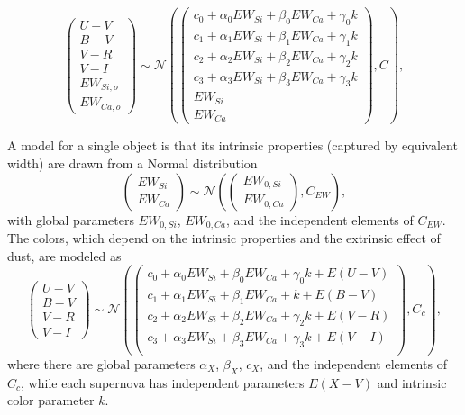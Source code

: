 \documentclass[11pt, oneside]{article}   	%
\begin{document}
\begin{equation}
\left(
\begin{matrix}
U-V\\B-V\\V-R\\V-I\\EW_{Si, o}\\ EW_{Ca, o}
\end{matrix}
\right) \sim \mathcal{N}
\left(
\left(
\begin{matrix}
c_0+\alpha_0 EW_{Si} + \beta_0 EW_{Ca} +\gamma_0 k  \\
c_1+\alpha_1 EW_{Si} + \beta_1 EW_{Ca}  +\gamma_1 k  \\
c_2+\alpha_2 EW_{Si} + \beta_2 EW_{Ca} +\gamma_2 k\\
c_3+\alpha_3 EW_{Si} + \beta_3 EW_{Ca} +\gamma_3 k\\
EW_{Si}\\ EW_{Ca}
\end{matrix}
\right)
,C
\right),
\end{equation}


A model for a single object is that its intrinsic properties (captured by equivalent width) are drawn from a Normal distribution
\begin{equation}
\left(
\begin{matrix}
EW_{Si}\\ EW_{Ca}
\end{matrix}
\right) \sim \mathcal{N}
\left(
\left(
\begin{matrix}
EW_{0, Si}\\ EW_{0, Ca}
\end{matrix}
\right)
,C_{EW}
\right),
\end{equation}
with global parameters $EW_{0, Si}$, $EW_{0, Ca}$, and the independent elements of $C_{EW}$.
The colors, which depend on the intrinsic properties and the extrinsic effect of dust, are modeled as
\begin{equation}
\left(
\begin{matrix}
U-V\\B-V\\V-R\\V-I
\end{matrix}
\right) \sim \mathcal{N}
\left(
\left(
\begin{matrix}
c_0+\alpha_0 EW_{Si} + \beta_0 EW_{Ca} +\gamma_0 k+ E(U-V) \\
c_1+\alpha_1 EW_{Si} + \beta_1 EW_{Ca}  +k +E(B-V) \\
c_2+\alpha_2 EW_{Si} + \beta_2 EW_{Ca} +\gamma_2 k + E(V-R)\\
c_3+\alpha_3 EW_{Si} + \beta_3 EW_{Ca} +\gamma_3 k +E(V-I)\\
\end{matrix}
\right)
,C_c
\right),
\end{equation}
where there are global parameters $\alpha_X$, $\beta_X$, $c_X$,  and the independent elements of $C_c$,
while each supernova has independent parameters $E(X-V)$ and intrinsic color parameter $k$.
\end{document}
